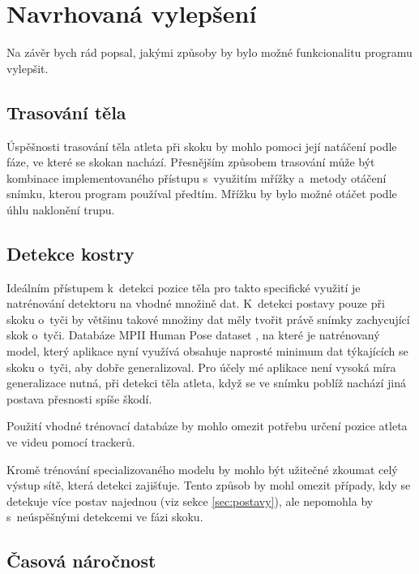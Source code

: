 \section*{Navrhovaná vylepšení}

Na závěr bych rád popsal, jakými způsoby by bylo možné funkcionalitu programu vylepšit.



\subsection*{Trasování těla}

Úspěšnosti trasování těla atleta při skoku by mohlo pomoci její natáčení podle fáze, ve které se skokan nachází. Přesnějším způsobem trasování může být kombinace implementovaného přístupu s~využitím mřížky a~metody otáčení snímku, kterou program používal předtím. Mřížku by bylo možné otáčet podle úhlu naklonění trupu.



\subsection*{Detekce kostry}

Ideálním přístupem k~detekci pozice těla pro takto specifické využití je natrénování detektoru na vhodné množině dat. K~detekci postavy pouze při skoku o~tyči by většinu takové množiny dat měly tvořit právě snímky zachycující skok o~tyči. Databáze MPII Human Pose dataset \citep{MPIIHPE}, na které je natrénovaný model, který aplikace nyní využívá obsahuje naprosté minimum dat týkajících se skoku o~tyči, aby dobře generalizoval. Pro účely mé aplikace není vysoká míra generalizace nutná, při detekci těla atleta, když se ve snímku poblíž nachází jiná postava přesnosti spíše škodí.

Použití vhodné trénovací databáze by mohlo omezit potřebu určení pozice atleta ve videu pomocí trackerů.

Kromě trénování specializovaného modelu by mohlo být užitečné zkoumat celý výstup sítě, která detekci zajišťuje. Tento způsob by mohl omezit případy, kdy se detekuje více postav najednou (viz sekce \ref{sec:postavy}), ale nepomohla by s~neúspěšnými detekcemi ve fázi skoku.



\subsection*{Časová náročnost}

